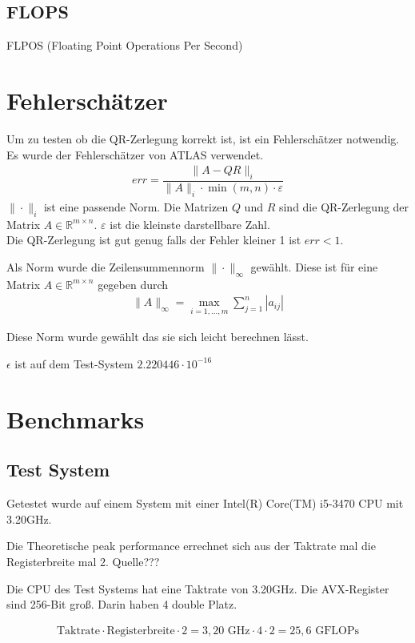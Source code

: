 \subsection{FLOPS}
FLPOS (Floating Point Operations Per Second) 

\section{Fehlerschätzer}

Um zu testen ob die QR-Zerlegung korrekt ist, ist ein Fehlerschätzer notwendig.
Es wurde der Fehlerschätzer von ATLAS\cite{atlas} verwendet.
\begin{align}
	err = \dfrac{\|A - QR\|_i}{\|A\|_i \cdot \min(m,n) \cdot \varepsilon}
\end{align}
$\|\cdot\|_i$ ist eine passende Norm.
Die Matrizen $Q$ und $R$ sind die QR-Zerlegung der Matrix $A \in \mathbb{R}^{m \times n}$.
$\varepsilon$ ist die kleinste darstellbare Zahl.\\
Die QR-Zerlegung ist gut genug falls der Fehler kleiner 1 ist $ err < 1 $.

Als Norm wurde die Zeilensummennorm $\|\cdot\|_\infty$ gewählt.
Diese ist für eine Matrix $A \in \mathbb{R}^{m\times n}$ gegeben durch
\begin{align*}
	\|A\|_\infty = \max_{i=1,...,m} \sum_{j=1}^{n} |a_{ij}|
\end{align*}

Diese Norm wurde gewählt das sie sich leicht berechnen lässt.

$\epsilon$ ist auf dem Test-System $2.220446\cdot10^{-16}$


\section{Benchmarks}

\subsection{Test System}

Getestet wurde auf einem System mit einer Intel(R) Core(TM) i5-3470 CPU mit 3.20GHz. 

Die Theoretische peak performance errechnet sich aus der Taktrate mal die Registerbreite mal 2. Quelle???


Die CPU des Test Systems hat eine Taktrate von 3.20GHz.
Die AVX-Register sind 256-Bit groß. Darin haben 4 double Platz.

\begin{align*}
	\text{Taktrate} \cdot \text{Registerbreite} \cdot 2= 3,20 \text{ GHz} \cdot 4 \cdot 2 = 25,6 \text{ GFLOPs}
\end{align*}

